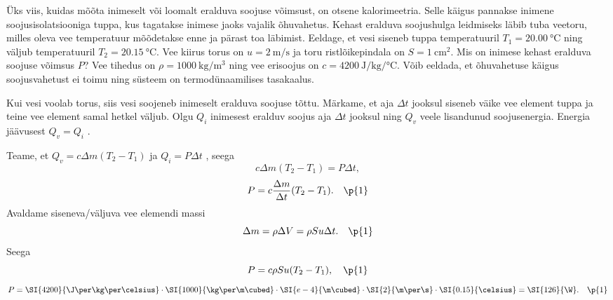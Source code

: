 
Üks viis, kuidas mõõta inimeselt või loomalt eralduva soojuse võimsust, on otsene kalorimeetria. Selle käigus pannakse inimene soojusisolatsiooniga tuppa, kus tagatakse inimese jaoks vajalik õhuvahetus. Kehast eralduva soojushulga leidmiseks läbib tuba veetoru, milles oleva vee temperatuur mõõdetakse enne ja pärast toa läbimist. Eeldage, et vesi siseneb tuppa temperatuuril $T_1 = \SI{20.00}{\celsius}$ ning väljub temperatuuril $T_2 = \SI{20.15}{\celsius}$. Vee kiirus torus on $u = \SI{2}{\meter\per\second}$ ja toru ristlõikepindala on $S=\SI{1}{\cm\squared}$. Mis on inimese kehast eralduva soojuse võimsus $P$? Vee tihedus on $\rho = \SI{1000}{\kg\per\meter\cubed}$ ning vee erisoojus on $c = \SI{4200}{\joule\per\kilogram\per\celsius}$. Võib eeldada, et õhuvahetuse käigus soojusvahetust ei toimu ning süsteem on termodünaamilises tasakaalus.


\hint

\solu
Kui vesi voolab torus, siis vesi soojeneb inimeselt eralduva soojuse tõttu. Märkame, et aja $\Delta t$ jooksul siseneb väike vee element tuppa ja teine vee element samal hetkel väljub. Olgu $Q_i$ inimesest eralduv soojus aja $\Delta t$ jooksul ning $Q_v$ veele lisandunud soojusenergia. Energia jäävusest $Q_v = Q_i$ .

Teame, et $Q_v = c\Delta m (T_2-T_1)$  ja $Q_i = P\Delta t$ , seega
$$c \Delta m (T_2 - T_1) = P\Delta t,$$
$$P = c \frac{\Delta m}{\Delta t} (T_2 - T_1).\quad\p{1}$$
Avaldame siseneva/väljuva vee elemendi massi
$$\Delta m = \rho \Delta V = \rho S u \Delta t. \quad\p{1}$$
Seega
$$P = c\rho S u (T_2-T_1),\quad\p{1}$$
$$P = \SI{4200}{\J\per\kg\per\celsius}\cdot \SI{1000}{\kg\per\m\cubed}\cdot \SI{e-4}{\m\cubed}\cdot \SI{2}{\m\per\s}\cdot\SI{0.15}{\celsius} = \SI{126}{\W} .\quad\p{1}$$
\probend